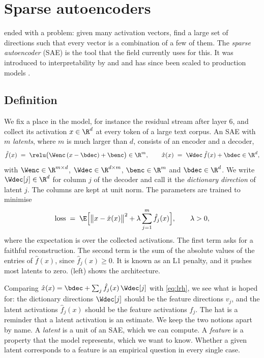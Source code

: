 \section{Sparse autoencoders}
\label{sec:sae}

 ended with a problem: given many activation vectors, find a large set of directions such
that every vector is a combination of a few of them. The \emph{sparse autoencoder} (SAE) is the tool that the
field currently uses for this. It was introduced to interpretability by \citet{bricken2023monosemanticity} and
\citet{cunningham2024sparse} and has since been scaled to production models
\citep{templeton2024scaling,gao2025scaling}.

\subsection{Definition}

We fix a place in the model, for instance the residual stream after layer 6, and collect its activation
$x\in\R^d$ at every token of a large text corpus. An SAE with $m$ \emph{latents}, where $m$ is much larger than
$d$, consists of an encoder and a decoder,
\begin{equation}\label{eq:sae}
\hat f(x) \;=\; \relu\big(\Wenc\,(x-\bdec)+\benc\big)\in\R^m,\qquad
\hat x(x) \;=\; \Wdec\,\hat f(x)+\bdec\in\R^d ,
\end{equation}
with $\Wenc\in\R^{m\times d}$, $\Wdec\in\R^{d\times m}$, $\benc\in\R^m$ and $\bdec\in\R^d$. We write $\Wdec[j]\in\R^d$
for column $j$ of the decoder and call it the \emph{dictionary direction} of latent $j$. The columns are kept at
unit norm. The parameters are trained to minimise
\begin{equation}\label{eq:saeloss}
\text{loss} \;=\; \E\Big[\big\|x-\hat x(x)\big\|^2+\lambda\sum_{j=1}^{m}\hat f_j(x)\Big],\qquad\lambda>0,
\end{equation}
where the expectation is over the collected activations. The first term asks for a faithful reconstruction.
The second term is the sum of the absolute values of the entries of $\hat f(x)$, since $\hat f_j(x)\ge0$. It is known as
an L1 penalty, and it pushes most latents to zero.
 (left) shows the architecture.

Comparing $\hat x(x)=\bdec+\sum_j\hat f_j(x)\,\Wdec[j]$ with \eqref{eq:lrh}, we see what is hoped for: the
dictionary directions $\Wdec[j]$ should be the feature directions $v_j$, and the latent activations $\hat f_j(x)$
should be the feature activations $f_j$. The hat is a reminder that a latent activation is an estimate. We keep the two notions apart by name. A \emph{latent} is a unit of an SAE, which we can compute.
A \emph{feature} is a property that the model represents, which we want to know. Whether a given latent
corresponds to a feature is an empirical question in every single case.

